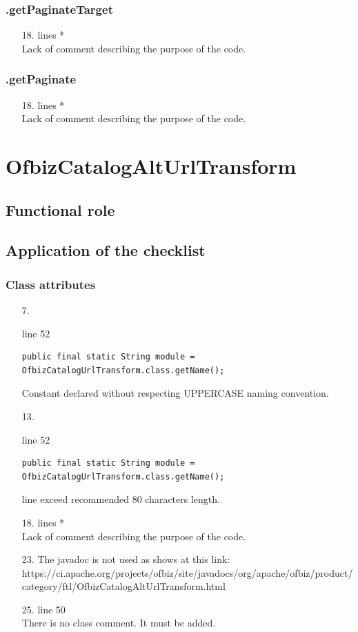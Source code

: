 \documentclass[english]{article}
\begin{document}
\subsubsection*{.getPaginateTarget}
\begin{itemize}
\item[18.]{lines  *\\
		Lack of comment describing the purpose of the code.}
\end{itemize}
\subsubsection*{.getPaginate}
\begin{itemize}
\item[18.]{lines  *\\
		Lack of comment describing the purpose of the code.}
\end{itemize}


\section{OfbizCatalogAltUrlTransform}
	\subsection{Functional role}
	\subsection{Application of the checklist}

\subsubsection*{Class attributes }	
\begin{itemize}

\item[7.]{line 52
		\begin{lstlisting} 
public final static String module = OfbizCatalogUrlTransform.class.getName();
		\end{lstlisting}
		Constant declared without respecting UPPERCASE naming convention.}

\item[13.]{line 52
		\begin{lstlisting} 
public final static String module = OfbizCatalogUrlTransform.class.getName();
		\end{lstlisting}
		line exceed recommended 80 characters length.}
		
		\item[18.]{lines  *\\
		Lack of comment describing the purpose of the code.}
		
			\item[23.]{The javadoc is not used as shows at this link:\\
https://ci.apache.org/projects/ofbiz/site/javadocs/org/apache/ofbiz/product/category/ftl/OfbizCatalogAltUrlTransform.html}
	\item[25.]{line 50\\
There is no class comment. It must be added.
}
\end{itemize}
	
\end{document}
